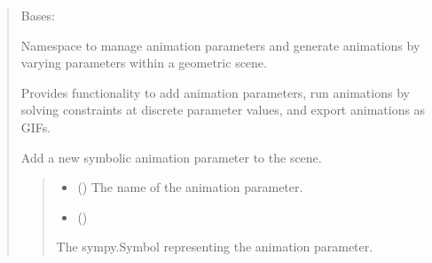 \documentclass[letterpaper,10pt,english]{sphinxmanual}
\begin{document}
\begin{quote}
\begin{fulllineitems}
\label{\detokenize{pygeox:pygeox.animate.AnimateNamespace}}
\pysigstartsignatures
\pysiglinewithargsret
{}
{}
{}
\pysigstopsignatures
\sphinxAtStartPar
Bases: 

\sphinxAtStartPar
Namespace to manage animation parameters and generate animations
by varying parameters within a geometric scene.

\sphinxAtStartPar
Provides functionality to add animation parameters, run animations
by solving constraints at discrete parameter values, and export
animations as GIFs.

\begin{fulllineitems}
\label{\detokenize{pygeox:pygeox.animate.AnimateNamespace.add_parameter}}
\pysigstartsignatures
\pysiglinewithargsret
{}
{\sphinxparamcomma {}}
{}
\pysigstopsignatures
\sphinxAtStartPar
Add a new symbolic animation parameter to the scene.
\begin{quote}\begin{description}
\begin{itemize}
\item {} 
\sphinxAtStartPar
{} () \textendash{} The name of the animation parameter.

\item {} 
\sphinxAtStartPar
{} (\sphinxstyleliteralemphasis{\sphinxupquote{ | }}\sphinxstyleliteralemphasis{\sphinxupquote{ | }}\sphinxstyleliteralemphasis{\sphinxupquote{ | }})

\end{itemize}

\sphinxAtStartPar
The sympy.Symbol representing the animation parameter.


\end{description}
\end{quote}
\end{fulllineitems}
\end{fulllineitems}
\end{quote}
\end{document}
